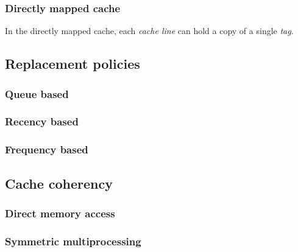 \subsubsection{Directly mapped cache}
In the directly mapped cache, each \textit{cache line} can hold a copy of
a single \textit{tag}.

%
\subsection{Replacement policies}
\subsubsection{Queue based}
\subsubsection{Recency based}
\subsubsection{Frequency based}
%
\subsection{Cache coherency}
\subsubsection{Direct memory access}
\subsubsection{Symmetric multiprocessing}
%
